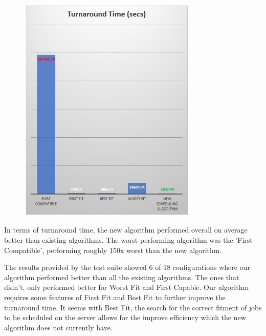 \documentclass[a4paper]{article} %
\begin{document}
\begin{figure}[!h]
    \centering
    \includegraphics[width=8.5cm]{images/TurnaroundTimeDiagram.jpg}
    \label{fig:my_label}
\end{figure}
In terms of turnaround time, the new algorithm performed overall on average better than existing algorithms. The worst performing algorithm was the 'First Compatible', performing roughly 150x worst than the new algorithm.
\medskip

The results provided by the test suite showed 6 of 18 configurations where our algorithm performed better than all the existing algorithms. The ones that didn't, only performed better for Worst Fit and First Capable. Our algorithm requires some features of First Fit and Best Fit to further improve the turnaround time. It seems with Best Fit, the search for the correct fitment of jobs to be scheduled on the server allows for the improve efficiency which the new algorithm does not currently have.
\end{document}
